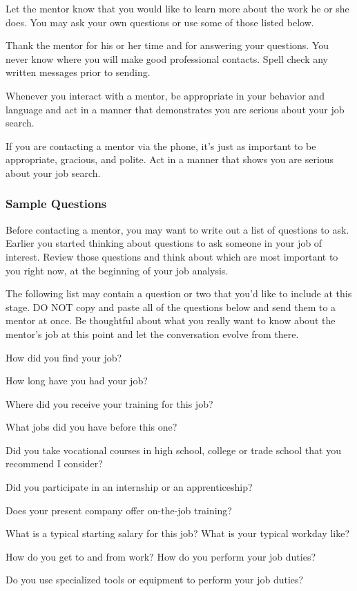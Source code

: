 Let the mentor know that you would like to learn more about the work he or she does. You may ask your own questions or use some of those listed below.

Thank the mentor for his or her time and for answering your questions.
You never know where you will make good professional contacts. Spell check any written messages prior to sending.

Whenever you interact with a mentor, be appropriate in your behavior and language and act in a manner that demonstrates you are serious about your job search.

If you are contacting a mentor via the phone, it's just as important to be appropriate, gracious, and polite. Act in a manner that shows you are serious about your job search.

\subsubsection*{Sample Questions}
Before contacting a mentor, you may want to write out a list of questions to ask. Earlier you started thinking about questions to ask someone in your job of interest. Review those questions and think about which are most important to you right now, at the beginning of your job analysis.

The following list may contain a question or two that you'd like to include at this stage. DO NOT copy and paste all of the questions below and send them to a mentor at once. Be thoughtful about what you really want to know about the mentor's job at this point and let the conversation evolve from there.

How did you find your job?

How long have you had your job?

Where did you receive your training for this job?

What jobs did you have before this one?

Did you take vocational courses in high school, college or trade school that you recommend I consider?

Did you participate in an internship or an apprenticeship?

Does your present company offer on-the-job training?

What is a typical starting salary for this job? What is your typical workday like?

How do you get to and from work? How do you perform your job duties?

Do you use specialized tools or equipment to perform your job duties?

